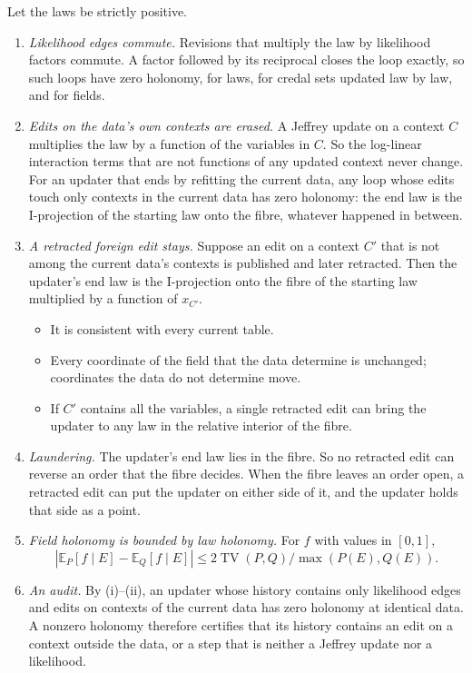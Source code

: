 \documentclass[11pt]{article}
\theoremstyle{definition}\newtheorem{definition}[theorem]{Definition}\newtheorem{remark}[theorem]{Remark}\newtheorem{example}[theorem]{Example}\newtheorem{problem}[theorem]{Open problem}\crefname{problem}{Problem}{Problems}
\begin{document}
\begin{proposition}\label{prop:revholonomy}
Let the laws be strictly positive.
\begin{enumerate}
\item[(i)] \emph{Likelihood edges commute.} Revisions that multiply the law by likelihood factors commute. A factor followed by its reciprocal closes the loop exactly, so such loops have zero holonomy, for laws, for credal sets updated law by law, and for fields.
\item[(ii)] \emph{Edits on the data's own contexts are erased.} A Jeffrey update on a context $C$ multiplies the law by a function of the variables in $C$. So the log-linear interaction terms that are not functions of any updated context never change. For an updater that ends by refitting the current data, any loop whose edits touch only contexts in the current data has zero holonomy: the end law is the I-projection of the starting law onto the fibre, whatever happened in between.
\item[(iii)] \emph{A retracted foreign edit stays.} Suppose an edit on a context $C'$ that is not among the current data's contexts is published and later retracted. Then the updater's end law is the I-projection onto the fibre of the starting law multiplied by a function of $x_{C'}$.
\begin{itemize}
\item It is consistent with every current table.
\item Every coordinate of the field that the data determine is unchanged; coordinates the data do not determine move.
\item If $C'$ contains all the variables, a single retracted edit can bring the updater to any law in the relative interior of the fibre.
\end{itemize}
\item[(iv)] \emph{Laundering.} The updater's end law lies in the fibre. So no retracted edit can reverse an order that the fibre decides. When the fibre leaves an order open, a retracted edit can put the updater on either side of it, and the updater holds that side as a point.
\item[(v)] \emph{Field holonomy is bounded by law holonomy.} For $f$ with values in $[0,1]$,
\[
|\mathbb E_P[f\mid E]-\mathbb E_Q[f\mid E]|\le 2\operatorname{TV}(P,Q)/\max(P(E),Q(E)).
\]
\item[(vi)] \emph{An audit.} By (i)--(ii), an updater whose history contains only likelihood edges and edits on contexts of the current data has zero holonomy at identical data. A nonzero holonomy therefore certifies that its history contains an edit on a context outside the data, or a step that is neither a Jeffrey update nor a likelihood.
\end{enumerate}
\end{proposition}
\end{document}
